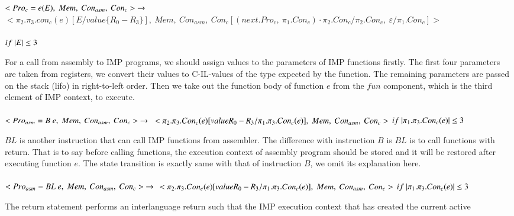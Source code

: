 \documentclass[letterpaper, 10 pt, conference]{IEEEtran}
\begin{document}
$<Pro_c=e(E),~Mem,~Con_{asm},~Con_c>~\rightarrow\\ \\$
$<\pi_2.\pi_3.con_c(e)[E/value\{R_0-R_3\}],~Mem,~Con_{asm},~Con_c[(next.Pro_c,~\pi_1.Con_c)\cdot \pi_2.Con_c/\pi_2.Con_c,~\varepsilon/\pi_1.Con_c]>$\\ \\
$if~|E|\leq 3 \\ \\$
\par For a call from assembly to IMP programs, we should assign values to the parameters of IMP functions firstly. The first four parameters are taken from registers, we convert their values to C-IL-values
of the type expected by the function. The remaining parameters are passed on the stack
(lifo) in right-to-left order. Then we take out the function body of function $e$ from the $fun$ component, which is the third element of IMP context, to execute.\\ \\
$<Pro_{asm}=B~e,~Mem,~Con_{asm},~Con_c>~\rightarrow\\ \\$
$<\pi_2.\pi_3.Con_c(e)[value{R_0-R_3}/\pi_1.\pi_3.Con_c(e)],~Mem,~Con_{asm},~Con_c>~\\ \\$$if~|\pi_1.\pi_3.Con_c(e)|\leq 3\\ \\$
\par $BL$ is another instruction that can call IMP functions from assembler. The difference with instruction $B$ is $BL$ is to call functions with return. That is to say before calling functions, the execution context of assembly program should be stored and it will be restored after executing function $e$. The state transition is exactly same with that of instruction $B$, we omit its explanation here. \\ \\
$<Pro_{asm}=BL~e,~Mem,~Con_{asm},~Con_c>~\rightarrow\\ \\$
$<\pi_2.\pi_3.Con_c(e)[value{R_0-R_3}/\pi_1.\pi_3.Con_c(e)],~Mem,~Con_{asm},~Con_c>~\\ \\$$if~|\pi_1.\pi_3.Con_c(e)|\leq 3\\ \\$
\par The return statement performs an interlanguage
return such that the IMP execution context that has created the current active
\end{document}
